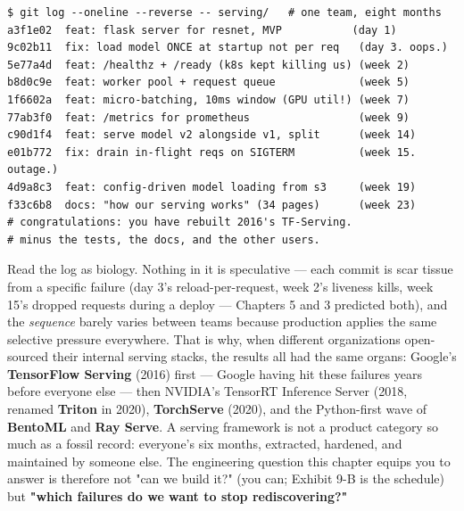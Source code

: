 \begin{terminalbox}
\begin{Verbatim}[breaklines=true,breakanywhere=true,fontsize=\small,formatcom=\color{tbbtermfg},codes=\tbbcodeactive]
$ git log --oneline --reverse -- serving/   # one team, eight months
a3f1e02  feat: flask server for resnet, MVP           (day 1)
9c02b11  fix: load model ONCE at startup not per req   (day 3. oops.)
5e77a4d  feat: /healthz + /ready (k8s kept killing us) (week 2)
b8d0c9e  feat: worker pool + request queue             (week 5)
1f6602a  feat: micro-batching, 10ms window (GPU util!) (week 7)
77ab3f0  feat: /metrics for prometheus                 (week 9)
c90d1f4  feat: serve model v2 alongside v1, split      (week 14)
e01b772  fix: drain in-flight reqs on SIGTERM          (week 15. outage.)
4d9a8c3  feat: config-driven model loading from s3     (week 19)
f33c6b8  docs: "how our serving works" (34 pages)      (week 23)
# congratulations: you have rebuilt 2016's TF-Serving.
# minus the tests, the docs, and the other users.
\end{Verbatim}
\end{terminalbox}

Read the log as biology. Nothing in it is speculative — each commit is scar tissue from a specific failure (day 3's reload-per-request, week 2's liveness kills, week 15's dropped requests during a deploy — Chapters 5 and 3 predicted both), and the \textit{sequence} barely varies between teams because production applies the same selective pressure everywhere. That is why, when different organizations open-sourced their internal serving stacks, the results all had the same organs: Google's \textbf{TensorFlow Serving} (2016) first — Google having hit these failures years before everyone else — then NVIDIA's TensorRT Inference Server (2018, renamed \textbf{Triton} in 2020), \textbf{TorchServe} (2020), and the Python-first wave of \textbf{BentoML} and \textbf{Ray Serve}. A serving framework is not a product category so much as a fossil record: everyone's six months, extracted, hardened, and maintained by someone else. The engineering question this chapter equips you to answer is therefore not "can we build it?" (you can; Exhibit 9-B is the schedule) but \textbf{"which failures do we want to stop rediscovering?"}

